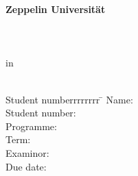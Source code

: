 \begin{centering}
\Large \textbf{Zeppelin Universität}\\
\Large \Chair \\
\vfill
\LARGE \textbf{\Title} \\
\vfill
\LARGE \Arbeit\\
\Large in \\
\LARGE \Seminar\\
\vfill
\begin{small}
\begin{doublespace}
\begin{tabbing}
	Student numberrrrrrrr \=\kill
	Name:\>\Name\\
	Student number:\>\MatrikelNummer\\
	Programme:\>\Programme\\
	Term:\>\Semester\\
	Examinor:\>\Pruefer\\
	Due date:\>\Date
	\end{tabbing}
\end{doublespace}
\end{small}
\end{centering}\vspace{1cm}

